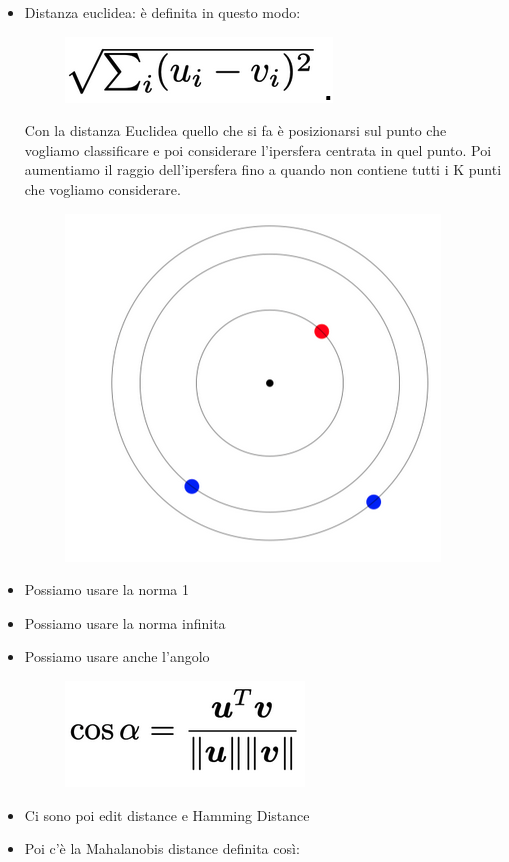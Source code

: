 \documentclass[14pt]{extreport}
\begin{document}
	\begin{itemize}
		\item Distanza euclidea: è definita in questo modo:
		
\begin{figure}[H] 
	\centering
	\includegraphics[width=0.7\linewidth]{463.jpeg}
	\end{figure}
		Con la distanza Euclidea quello che si fa è posizionarsi sul punto che vogliamo classificare e poi considerare l’ipersfera centrata in quel punto. Poi aumentiamo il raggio dell’ipersfera fino a quando non contiene tutti i K punti che vogliamo considerare.
	
\begin{figure}[H] 
	\centering
	\includegraphics[width=0.7\linewidth]{466.jpeg}
	\end{figure}
		\item 	Possiamo usare la norma 1
	\item Possiamo usare la norma infinita
	\item Possiamo usare anche l’angolo
	
\begin{figure}[H] 
	\centering
	\includegraphics[width=0.7\linewidth]{465.jpeg}
	\end{figure}
	\item Ci sono poi edit distance e Hamming Distance
	\item Poi c’è la Mahalanobis distance definita così:
	

\end{itemize}
\end{document}
